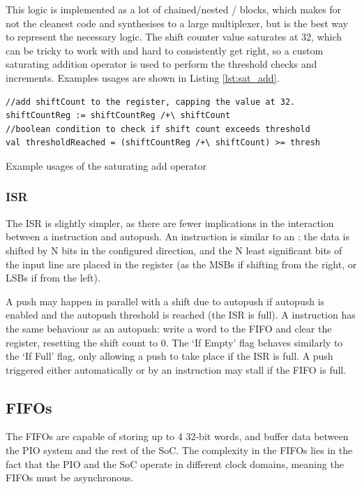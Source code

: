 This logic is implemented as a lot of chained/nested / blocks, which makes for not the cleanest code and synthesises to a large multiplexer, but is the best way to represent the necessary logic. The shift counter value saturates at 32, which can be tricky to work with and hard to consistently get right, so a custom saturating addition operator \txt{/+|} is used to perform the threshold checks and increments. Examples usages are shown in Listing \ref{lst:sat_add}.


\begin{listing}[h!]
    \vspace{0.5cm}
    \begin{verbatim}
//add shiftCount to the register, capping the value at 32.
shiftCountReg := shiftCountReg /+\ shiftCount
//boolean condition to check if shift count exceeds threshold
val thresholdReached = (shiftCountReg /+\ shiftCount) >= thresh
    \end{verbatim}
    \caption{Example usages of the saturating add operator}
    \label{lst:sat_add}
\end{listing}

\subsubsection{ISR}

The ISR is slightly simpler, as there are fewer implications in the interaction between a  instruction and autopush. An  instruction is similar to an : the data is shifted by N bits in the configured direction, and the N least significant bits of the input line are placed in the register (as the MSBs if shifting from the right, or LSBs if from the left).

A push may happen in parallel with a shift due to autopush if autopush is enabled and the autopush threshold is reached (the ISR is full). A  instruction has the same behaviour as an autopush: write a word to the FIFO and clear the register, resetting the shift count to 0. The `If Empty' flag behaves similarly to the `If Full' flag, only allowing a push to take place if the ISR is full. A push triggered either automatically or by an instruction may stall if the FIFO is full.

\subsection{FIFOs}

The FIFOs are capable of storing up to 4 32-bit words, and buffer data between the PIO system and the rest of the SoC. The complexity in the FIFOs lies in the fact that the PIO and the SoC operate in different clock domains, meaning the FIFOs must be asynchronous.

